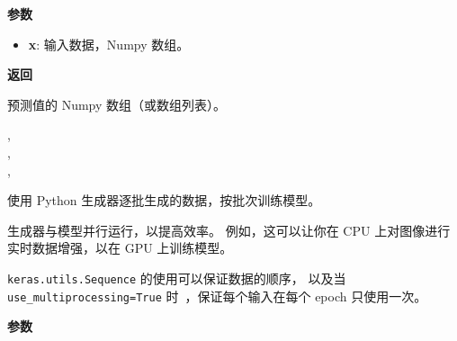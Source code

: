 \textbf{参数}

\begin{itemize}
\tightlist
\item
  \textbf{x}: 输入数据，Numpy 数组。
\end{itemize}

\textbf{返回}

预测值的 Numpy 数组（或数组列表）。



\label{fitux5fgenerator}

\begin{Shaded}
\begin{Highlighting}[]
\OperatorTok{=}\OperatorTok{=}\OperatorTok{=}, \\
\hspace{2.5cm}\OperatorTok{=}\OperatorTok{=}\OperatorTok{=}, \\
\hspace{2.5cm}\OperatorTok{=}\OperatorTok{=}\OperatorTok{=}, \\
\hspace{2.5cm}\OperatorTok{=}\OperatorTok{=}\OperatorTok{=}\NormalTok{)}
\end{Highlighting}
\end{Shaded}

使用 Python 生成器逐批生成的数据，按批次训练模型。

生成器与模型并行运行，以提高效率。 例如，这可以让你在 CPU
上对图像进行实时数据增强，以在 GPU 上训练模型。

\texttt{keras.utils.Sequence} 的使用可以保证数据的顺序， 以及当
\texttt{use\_multiprocessing=True} 时~，保证每个输入在每个 epoch
只使用一次。

\textbf{参数}

